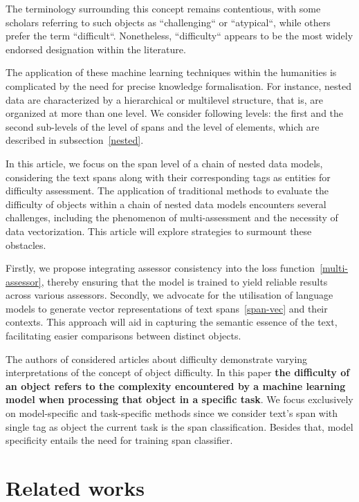 \documentclass{article}
\begin{document}
The terminology surrounding this concept remains contentious, with some scholars referring to such objects as ``challenging`` or ``atypical``, while others prefer the term ``difficult``. Nonetheless, ``difficulty`` appears to be the most widely endorsed designation within the literature. 

The application of these machine learning techniques within the humanities is complicated by the need for precise knowledge formalisation. For instance, nested data are characterized by a hierarchical or multilevel structure, that is, are organized at more than one level. We consider following levels: the first and the second sub-levels of the level of spans and the level of elements, which are described in subsection~\ref{nested}. 

In this article, we focus on the span level of a chain of nested data models, considering the text spans along with their corresponding tags as entities for difficulty assessment. The application of traditional methods to evaluate the difficulty of objects within a chain of nested data models encounters several challenges, including the phenomenon of multi-assessment and the necessity of data vectorization. This article will explore strategies to surmount these obstacles.

Firstly, we propose integrating assessor consistency into the loss function~\ref{multi-assessor}, thereby ensuring that the model is trained to yield reliable results across various assessors. Secondly, we advocate for the utilisation of language models to generate vector representations of text spans~\ref{span-vec} and their contexts. This approach will aid in capturing the semantic essence of the text, facilitating easier comparisons between distinct objects.

The authors of considered articles about difficulty demonstrate varying interpretations of the concept of object difficulty. In this paper \textbf{the difficulty of an object refers to the complexity encountered by a machine learning model when processing that object in a specific task}. We focus exclusively on model-specific and task-specific methods since we consider text's span with single tag as object the current task is the span classification. Besides that, model specificity entails the need for training span classifier.

\section{Related works}
\end{document}

